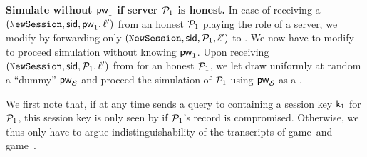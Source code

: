 \begin{games}
% 

\textbf{Simulate without $\mathsf{pw}_{1}$ if server $\mathcal{P}_{1}$ is honest.}
In case of receiving a $(\texttt{NewSession},\mathsf{sid},\mathsf{pw}_{1},\ell')$ from an honest $\mathcal{P}_{1}$ playing the role of a server, we modify \Func by forwarding only $(\texttt{NewSession},\mathsf{sid},\mathcal{P}_{1},\ell')$ to \Sim. We now have to modify \Sim to proceed simulation without knowing $\mathsf{pw}_{1}$.
Upon receiving $(\texttt{NewSession},\mathsf{sid},\mathcal{P}_{1},\ell')$ from \Func for an honest $\mathcal{P}_{1}$, we let \Sim draw uniformly at random a ``dummy'' \password $\mathsf{pw}_\mathcal{S}$ and proceed the simulation of $\mathcal{P}_{1}$ using $\mathsf{pw}_\mathcal{S}$ as a \password.

We first note that, if at any time \Sim sends a \NewKey query to \Func containing a session key $\mathsf{k}_{1}$ for $\mathcal{P}_{1}$, this session key is only seen by \Env if $\mathcal{P}_{1}$'s record is compromised. Otherwise, we thus only have to argue indistinguishability of the transcripts of game~\previousgame and game~\thisgame. 


\end{games}
